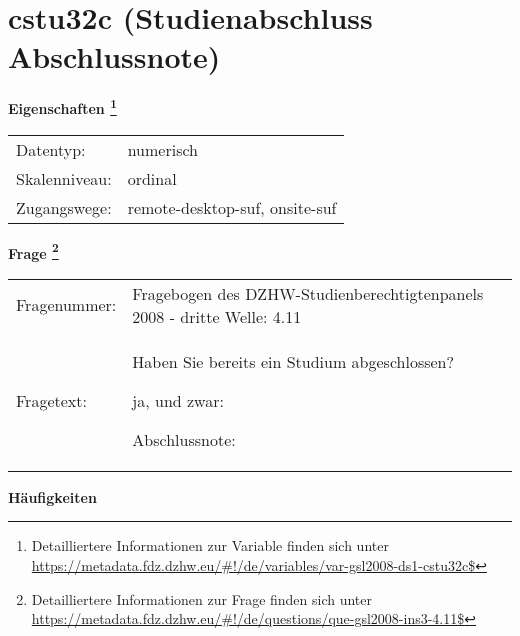 
    \setcounter{footnote}{0}

    \vspace*{-1.8cm}
	\section{cstu32c (Studienabschluss Abschlussnote)}
	\label{section:cstu32c}



    \vspace*{0.5cm}
    \noindent\textbf{Eigenschaften
	\footnote{Detailliertere Informationen zur Variable finden sich unter
		\url{https://metadata.fdz.dzhw.eu/\#!/de/variables/var-gsl2008-ds1-cstu32c$}}}\\
	\begin{tabularx}{\hsize}{@{}lX}
	Datentyp: & numerisch \\
	Skalenniveau: & ordinal \\
	Zugangswege: &
	  remote-desktop-suf, 
	  onsite-suf
 \\
    \end{tabularx}



				\vspace*{0.5cm}
                \noindent\textbf{Frage
	                \footnote{Detailliertere Informationen zur Frage finden sich unter
		              \url{https://metadata.fdz.dzhw.eu/\#!/de/questions/que-gsl2008-ins3-4.11$}}}\\
				\begin{tabularx}{\hsize}{@{}lX}
					Fragenummer: &
					  Fragebogen des DZHW-Studienberechtigtenpanels 2008 - dritte Welle:
					  4.11
 \\
					Fragetext: & Haben Sie bereits ein Studium abgeschlossen?\par  ja, und zwar:\par  Abschlussnote: \\
				\end{tabularx}





        		\vspace*{0.5cm}
                \noindent\textbf{Häufigkeiten}


